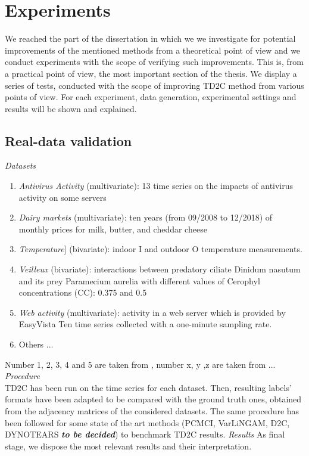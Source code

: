 \chapter{Experiments}\label{Contributions}

We reached the part of the dissertation in which we we investigate for potential improvements of the mentioned methods from a theoretical point of view and we conduct experiments with the scope of verifying such improvements. This is, from a practical point of view, the most important section of the thesis. We display a series of tests, conducted with the scope of improving TD2C method from various points of view. For each experiment, data generation, experimental settings and results will be shown and explained.

\section{Real-data validation}\label{contr1}

\textit{Datasets}
\begin{enumerate}
    \item \textit{Antivirus Activity} (multivariate): 13 time series on the impacts of antivirus activity on some servers 
    \item \textit{Dairy markets} (multivariate): ten years (from 09/2008 to 12/2018) of monthly prices for milk, butter, and cheddar cheese
    \item \textit{Temperature}] (bivariate): indoor I and outdoor O temperature measurements.
    \item \textit{Veilleux} (bivariate): interactions between predatory ciliate Dinidum nasutum and its prey Paramecium aurelia with different values of Cerophyl concentrations (CC): 0.375 and 0.5
    \item \textit{Web activity} (multivariate): activity in a web server which is provided by EasyVista Ten time series collected with a one-minute sampling rate.
    \item Others ...
\end{enumerate}

Number 1, 2, 3, 4 and 5 are taken from \cite{bystrova2024causal}, number x, y ,z are taken from ...\\

\textit{Procedure}\\
TD2C has been run on the time series for each dataset. Then, resulting labels' formats have been adapted to be compared with the ground truth ones, obtained from the adjacency matrices of the considered datasets. The same procedure has been followed for some state of the art methods (PCMCI, VarLiNGAM, D2C, DYNOTEARS \textbf{\textit{to be decided}}) to benchmark TD2C results.
\textit{Results}
As final stage, we dispose the most relevant results and their interpretation.\\

